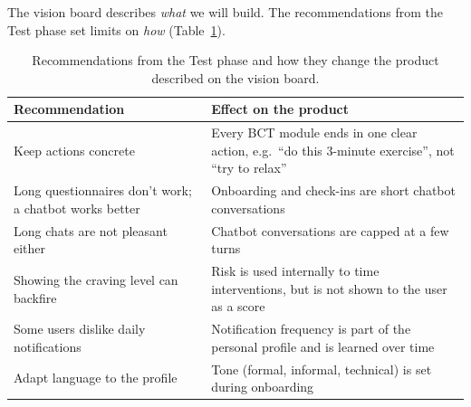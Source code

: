 The vision board describes \textit{what} we will build. The recommendations from the Test phase set limits on \textit{how} (Table~\ref{tab:recommendations}).

\begin{table}[htbp]
    \centering
    \small
    \begin{tabularx}{\textwidth}{>{\raggedright\arraybackslash}p{} >{\raggedright\arraybackslash}X}
        \toprule
        \textbf{Recommendation} & \textbf{Effect on the product} \\
        \midrule
        Keep actions concrete & Every BCT module ends in one clear action, e.g.\ ``do this 3-minute exercise'', not ``try to relax'' \\
        Long questionnaires don't work; a chatbot works better & Onboarding and check-ins are short chatbot conversations \\
        Long chats are not pleasant either & Chatbot conversations are capped at a few turns \\
        Showing the craving level can backfire & Risk is used internally to time interventions, but is not shown to the user as a score \\
        Some users dislike daily notifications & Notification frequency is part of the personal profile and is learned over time \\
        Adapt language to the profile & Tone (formal, informal, technical) is set during onboarding \\
        \bottomrule
    \end{tabularx}
    \caption{Recommendations from the Test phase and how they change the product described on the vision board.}
    \label{tab:recommendations}
\end{table}
